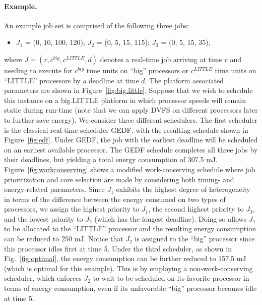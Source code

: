 \paragraph{Example.}
An example job set is comprised of the following three jobs:
\begin{itemize}
\item $J_1$ = (0, 10, 100, 120); $J_2$ = (0, 5, 15, 115); $J_3$ = (0, 5, 15, 35),
\end{itemize}
 where $J = (r, c^{big}, c^{LITTLE}, d)$ denotes a real-time job arriving at time $r$ and needing to execute for $c^{big}$ time units on ``big'' processors or $c^{LITTLE}$ time units on ``LITTLE'' processors by a deadline at time $d$. 
 The platform associated parameters are shown in Figure~\ref{fig:big.little}. Suppose that we wish to schedule this instance on a big.LITTLE platform in which processor speeds will remain static during run-time (note that we can apply  DVFS on different processors later to further save energy). We consider three different schedulers. The first scheduler is the classical real-time scheduler GEDF, with the resulting schedule shown in Figure~\ref{fig:edf}. Under GEDF, the job with the earliest deadline will be scheduled on an earliest available processor. The GEDF schedule completes all three jobs by their deadlines, but yielding a total energy consumption of 307.5 mJ. Figure~\ref{fig:workconserving} shows a modified work-conserving schedule where job prioritization and core selection are made by considering both timing- and energy-related parameters. Since $J_1$ exhibits the highest degree of heterogeneity in terms of the difference between the energy consumed on two types of processors, we assign the highest priority to $J_1$, the second highest priority to $J_3$, and the lowest priority to $J_2$ (which has the longest deadline). Doing so allows $J_1$ to be allocated to the ``LITTLE'' processor and the resulting energy consumption can be reduced to 250 mJ. Notice that $J_2$ is assigned to the ``big'' processor since this processor idles first at time 5. Under the third scheduler, as shown in Fig.~\ref{fig:optimal}, the energy consumption can be further reduced to 157.5 mJ (which is optimal for this example). This is by employing a non-work-conserving scheduler, which enforces $J_2$ to wait to be scheduled on its favorite processor in terms of energy consumption, even if its unfavorable ``big'' processor becomes idle at time 5.


